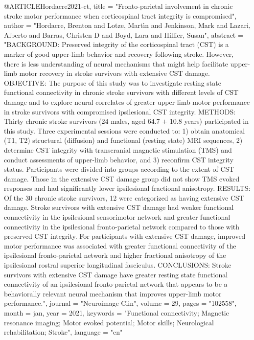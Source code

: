 @ARTICLE{Hordacre2021-ct,
	title    = "Fronto-parietal involvement in chronic stroke motor performance
	when corticospinal tract integrity is compromised",
	author   = "Hordacre, Brenton and Lotze, Mart{\'\i}n and Jenkinson, Mark and
	Lazari, Alberto and Barras, Christen D and Boyd, Lara and
	Hillier, Susan",
	abstract = "BACKGROUND: Preserved integrity of the corticospinal tract (CST)
	is a marker of good upper-limb behavior and recovery following
	stroke. However, there is less understanding of neural mechanisms
	that might help facilitate upper-limb motor recovery in stroke
	survivors with extensive CST damage. OBJECTIVE: The purpose of
	this study was to investigate resting state functional
	connectivity in chronic stroke survivors with different levels of
	CST damage and to explore neural correlates of greater upper-limb
	motor performance in stroke survivors with compromised
	ipsilesional CST integrity. METHODS: Thirty chronic stroke
	survivors (24 males, aged 64.7 $\pm$ 10.8 years) participated in
	this study. Three experimental sessions were conducted to: 1)
	obtain anatomical (T1, T2) structural (diffusion) and functional
	(resting state) MRI sequences, 2) determine CST integrity with
	transcranial magnetic stimulation (TMS) and conduct assessments
	of upper-limb behavior, and 3) reconfirm CST integrity status.
	Participants were divided into groups according to the extent of
	CST damage. Those in the extensive CST damage group did not show
	TMS evoked responses and had significantly lower ipsilesional
	fractional anisotropy. RESULTS: Of the 30 chronic stroke
	survivors, 12 were categorized as having extensive CST damage.
	Stroke survivors with extensive CST damage had weaker functional
	connectivity in the ipsilesional sensorimotor network and greater
	functional connectivity in the ipsilesional fronto-parietal
	network compared to those with preserved CST integrity. For
	participants with extensive CST damage, improved motor
	performance was associated with greater functional connectivity
	of the ipsilesional fronto-parietal network and higher fractional
	anisotropy of the ipsilesional rostral superior longitudinal
	fasciculus. CONCLUSIONS: Stroke survivors with extensive CST
	damage have greater resting state functional connectivity of an
	ipsilesional fronto-parietal network that appears to be a
	behaviorally relevant neural mechanism that improves upper-limb
	motor performance.",
	journal  = "Neuroimage Clin",
	volume   =  29,
	pages    = "102558",
	month    =  jan,
	year     =  2021,
	keywords = "Functional connectivity; Magnetic resonance imaging; Motor evoked
	potential; Motor skills; Neurological rehabilitation; Stroke",
	language = "en"
}

